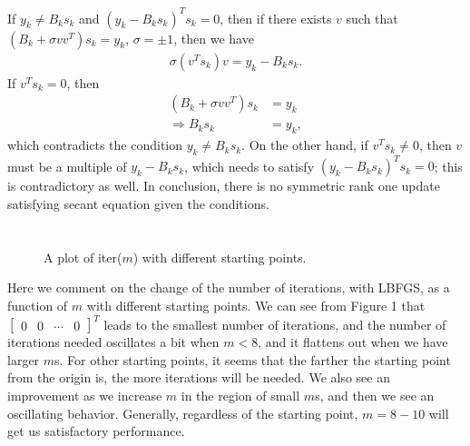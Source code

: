 \documentclass[11pt]{article}
\begin{document}
\section{}
If $y_k \neq B_ks_k$ and $(y_k-B_ks_k)^Ts_k=0$, then if there exists $v$ such that $(B_k+\sigma vv^T)s_k = y_k$, $\sigma=\pm1$, then we have
\begin{equation}\begin{split} 
\sigma(v^Ts_k)v = y_k-B_ks_k.
\end{split}\nonumber\end{equation} 
If $v^Ts_k=0$, then
\begin{equation}\begin{split}
(B_k+\sigma vv^T)s_k &= y_k \\
\Rightarrow B_ks_k &= y_k,
\end{split}\nonumber\end{equation} 
which contradicts the condition $y_k \neq B_ks_k$. On the other hand, if $v^Ts_k\neq0$, then $v$ must be a multiple of $y_k-B_ks_k$, which needs to satisfy $(y_k-B_ks_k)^Ts_k=0$; this is contradictory as well. In conclusion, there is no symmetric rank one update satisfying secant equation given the conditions.
\pagebreak
\section{}
\subsection{}
\begin{figure}[t]
\centering
\caption{A plot of iter($m$) with different starting points.}
\end{figure}
Here we comment on the change of the number of iterations, with LBFGS, as a function of $m$ with different starting points. We can see from Figure 1 that $\begin{bmatrix}0 & 0 &\cdots&0 \end{bmatrix}^T $ leads to the smallest number of iterations, and the number of iterations needed oscillates a bit when $m<8$, and it flattens out when we have larger $m$s. For other starting points, it seems that the farther the starting point from the origin is, the more iterations will be needed. We also see an improvement as we increase $m$ in the region of small $m$s, and then we see an oscillating behavior. Generally, regardless of the starting point, $m=8-10$ will get us satisfactory performance.
\end{document}
